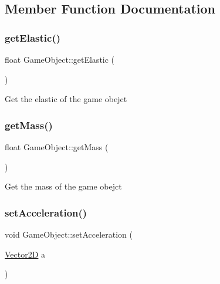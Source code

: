\subsection{Member Function Documentation}
\mbox{\label{class_game_object_a0561027ef00b15b7126a4eb2a6883ac5}} 
\subsubsection{\texorpdfstring{get\+Elastic()}{getElastic()}}
{\footnotesize\ttfamily float Game\+Object\+::get\+Elastic (\begin{DoxyParamCaption}{ }\end{DoxyParamCaption})\hspace{0.3cm}{\ttfamily [inline]}}

Get the elastic of the game obejct \mbox{\label{class_game_object_acb377b485652244e2558128575fb532e}} 
\subsubsection{\texorpdfstring{get\+Mass()}{getMass()}}
{\footnotesize\ttfamily float Game\+Object\+::get\+Mass (\begin{DoxyParamCaption}{ }\end{DoxyParamCaption})\hspace{0.3cm}{\ttfamily [inline]}}

Get the mass of the game obejct \mbox{\label{class_game_object_a575ad61234d55aae9f3c6dd1ad7207bd}} 
\subsubsection{\texorpdfstring{set\+Acceleration()}{setAcceleration()}}
{\footnotesize\ttfamily void Game\+Object\+::set\+Acceleration (\begin{DoxyParamCaption}\item[{\mbox{\hyperlink{struct_vector2_d}{Vector2D}}}]{a }\end{DoxyParamCaption})\hspace{0.3cm}{\ttfamily [inline]}}




